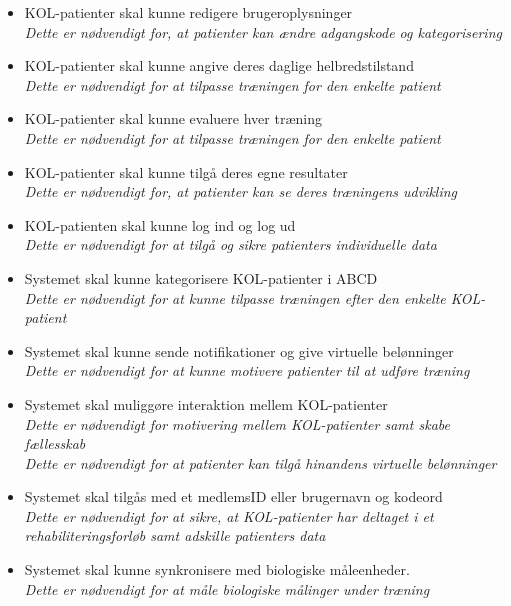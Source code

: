 \noindent	
\begin{itemize}
\item KOL-patienter skal kunne redigere brugeroplysninger
	\\
	\textit{Dette er nødvendigt for, at patienter kan ændre adgangskode og kategorisering}
\item KOL-patienter skal kunne angive deres daglige helbredstilstand 
\\
\textit{Dette er nødvendigt for at tilpasse træningen for den enkelte patient}
\item KOL-patienter skal kunne evaluere hver træning
\\
	\textit{Dette er nødvendigt for at tilpasse træningen for den enkelte patient }
\item KOL-patienter skal kunne tilgå deres egne resultater
	\\
	\textit{Dette er nødvendigt for, at patienter kan se deres træningens udvikling}
\item KOL-patienten skal kunne log ind og log ud
	\\
	\textit{Dette er nødvendigt for at tilgå og sikre patienters individuelle data}
\item Systemet skal kunne kategorisere KOL-patienter i ABCD
\\
	\textit{Dette er nødvendigt for at kunne tilpasse træningen efter den enkelte KOL-patient}
\item Systemet skal kunne sende notifikationer og give virtuelle belønninger 
	\\
	\textit{Dette er nødvendigt for at kunne motivere patienter til at udføre træning}
\item Systemet skal muliggøre interaktion mellem KOL-patienter
	\\
	\textit{Dette er nødvendigt for motivering mellem KOL-patienter samt skabe fællesskab}
	\\
	\textit{Dette er nødvendigt for at patienter kan tilgå hinandens virtuelle belønninger}
\item Systemet skal tilgås med et medlemsID eller brugernavn og kodeord
	\\
\textit{Dette er nødvendigt for at sikre, at KOL-patienter har deltaget i et rehabiliteringsforløb samt adskille patienters data}
\item Systemet skal kunne synkronisere med biologiske måleenheder. 
\\
\textit{Dette er nødvendigt for at måle biologiske målinger under træning}
\end{itemize}


